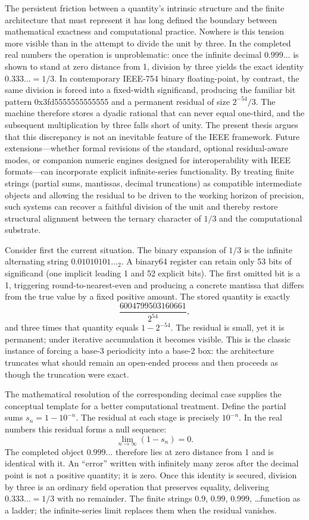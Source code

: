 The persistent friction between a quantity’s intrinsic structure and the finite architecture that must represent it has long defined the boundary between mathematical exactness and computational practice. Nowhere is this tension more visible than in the attempt to divide the unit by three. In the completed real numbers the operation is unproblematic: once the infinite decimal \(0.999\ldots\) is shown to stand at zero distance from 1, division by three yields the exact identity \(0.333\ldots = 1/3\). In contemporary IEEE-754 binary floating-point, by contrast, the same division is forced into a fixed-width significand, producing the familiar bit pattern 0x3fd5555555555555 and a permanent residual of size \(2^{-54}/3\). The machine therefore stores a dyadic rational that can never equal one-third, and the subsequent multiplication by three falls short of unity. The present thesis argues that this discrepancy is not an inevitable feature of the IEEE framework. Future extensions—whether formal revisions of the standard, optional residual-aware modes, or companion numeric engines designed for interoperability with IEEE formats—can incorporate explicit infinite-series functionality. By treating finite strings (partial sums, mantissas, decimal truncations) as compatible intermediate objects and allowing the residual to be driven to the working horizon of precision, such systems can recover a faithful division of the unit and thereby restore structural alignment between the ternary character of \(1/3\) and the computational substrate.

Consider first the current situation. The binary expansion of \(1/3\) is the infinite alternating string \(0.01010101\ldots_2\). A binary64 register can retain only 53 bits of significand (one implicit leading 1 and 52 explicit bits). The first omitted bit is a 1, triggering round-to-nearest-even and producing a concrete mantissa that differs from the true value by a fixed positive amount. The stored quantity is exactly
\[
\frac{6004799503160661}{2^{54}},
\]
and three times that quantity equals \(1 - 2^{-54}\). The residual is small, yet it is permanent; under iterative accumulation it becomes visible. This is the classic instance of forcing a base-3 periodicity into a base-2 box: the architecture truncates what should remain an open-ended process and then proceeds as though the truncation were exact.

The mathematical resolution of the corresponding decimal case supplies the conceptual template for a better computational treatment. Define the partial sums \(s_n = 1 - 10^{-n}\). The residual at each stage is precisely \(10^{-n}\). In the real numbers this residual forms a null sequence:
\[
\lim_{n\to\infty}(1-s_n)=0.
\]
The completed object \(0.999\ldots\) therefore lies at zero distance from 1 and is identical with it. An “error” written with infinitely many zeros after the decimal point is not a positive quantity; it is zero. Once this identity is secured, division by three is an ordinary field operation that preserves equality, delivering \(0.333\ldots = 1/3\) with no remainder. The finite strings \(0.9\), \(0.99\), \(0.999\), \ldots function as a ladder; the infinite-series limit replaces them when the residual vanishes.

